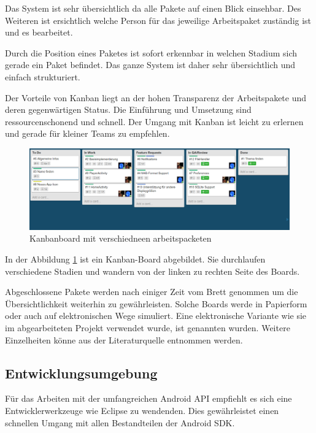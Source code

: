 Das System ist sehr übersichtlich da alle Pakete auf einen Blick einsehbar. Des Weiteren ist ersichtlich welche Person für das jeweilige Arbeitspaket zuständig ist und es bearbeitet.

Durch die Position eines Paketes ist sofort erkennbar in welchen Stadium sich gerade ein Paket befindet. Das ganze System ist daher sehr übersichtlich und einfach strukturiert.

Der Vorteile von Kanban liegt an der hohen Transparenz der Arbeitspakete und deren gegenwärtigen Status. Die Einführung und Umsetzung sind ressourcenschonend und schnell. Der Umgang mit Kanban ist leicht zu erlernen und gerade für kleiner Teams zu empfehlen.

\begin{figure}
\begin{center}
\includegraphics[scale=0.35]{images/kanban}
\caption{Kanbanboard mit verschiedneen arbeitspacketen}
\label{kanban}
\end{center}
\end{figure}

In der Abbildung \ref{kanban} ist ein Kanban-Board abgebildet. Sie durchlaufen verschiedene Stadien und wandern von der linken zu rechten Seite des Boards.

Abgeschlossene Pakete werden nach einiger Zeit vom Brett genommen um die Übersichtlichkeit weiterhin zu gewährleisten. Solche Boards werde in Papierform oder auch auf elektronischen Wege simuliert. Eine elektronische Variante wie sie im abgearbeiteten Projekt verwendet wurde, ist genannten wurden. Weitere Einzelheiten könne aus der Literaturquelle \cite{9783898647304} entnommen werden.

\subsection{Entwicklungsumgebung}

Für das Arbeiten mit der umfangreichen Android API empfiehlt es sich eine Entwicklerwerkzeuge wie Eclipse zu wendenden. Dies gewährleistet einen schnellen Umgang mit allen Bestandteilen der Android SDK.


